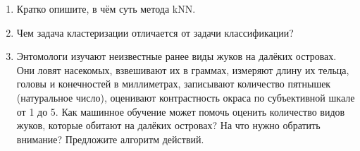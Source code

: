 \documentclass[a4paper,10pt]{article}
\begin{document}
\begin{enumerate}
	\item Кратко опишите, в чём суть метода kNN.
	
	\item Чем задача кластеризации отличается от задачи классификации?
	
	
	\item Энтомологи изучают неизвестные ранее виды жуков на далёких островах. Они ловят насекомых, взвешивают их в граммах, измеряют длину их тельца, головы и конечностей в миллиметрах, записывают количество пятнышек (натуральное число), оценивают контрастность окраса по субъективной шкале от 1 до 5. Как машинное обучение может помочь оценить количество видов жуков, которые обитают на далёких островах? На что нужно обратить внимание? Предложите алгоритм действий.
	
\end{enumerate}
\end{document}
